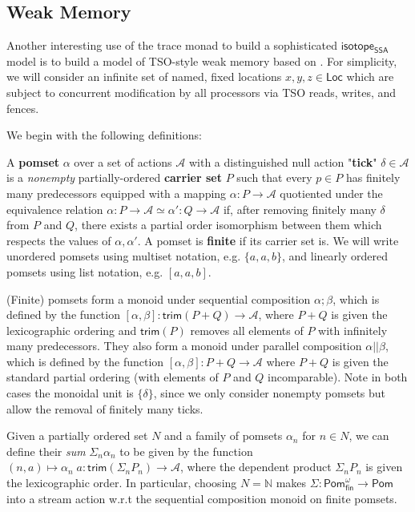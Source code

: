 \documentclass[acmsmall,screen,review]{acmart}
\newcommand{\mc}[1]{\ensuremath{\mathcal{#1}}}
\newcommand{\ms}[1]{\ensuremath{\mathsf{#1}}}
\newcommand{\nats}{\mathbb{N}}
\newcommand{\isotopessa}{\ms{isotope_{SSA}}}
\begin{document}
\subsection{Weak Memory}

Another interesting use of the trace monad to build a sophisticated \isotopessa model is to build a model of TSO-style weak memory based on \citet{sparky}. For simplicity, we will consider an infinite set of named, fixed locations \(x, y, z \in \ms{Loc}\) which are subject to concurrent modification by all processors via TSO reads, writes, and fences.

We begin with the following definitions:
\begin{definition}[Pomset] 
  A \textbf{pomset} \(\alpha\) over a set of actions \(\mc{A}\) with a
  distinguished null action "\textbf{tick}" \(\delta \in \mc{A}\) is a
  \textit{nonempty} partially-ordered \textbf{carrier set} \(P\) such that every
  \(p \in P\) has finitely many predecessors equipped with a mapping \(\alpha: P
  \to \mc{A}\) quotiented under the equivalence relation \(\alpha: P \to \mc{A}
  \simeq \alpha': Q \to \mc{A}\) if, after removing finitely many \(\delta\)
  from \(P\) and \(Q\), there exists a partial order isomorphism between them
  which respects the values of \(\alpha, \alpha'\). A pomset is \textbf{finite}
  if its carrier set is. We will write unordered pomsets using multiset
  notation, e.g. \(\{a, a, b\}\), and linearly ordered pomsets using list
  notation, e.g. \([a, a, b]\).
\end{definition}
(Finite) pomsets form a monoid under sequential composition \(\alpha;\beta\),
which is defined by the function \([\alpha, \beta]: \ms{trim}(P + Q) \to
\mc{A}\), where \(P + Q\) is given the lexicographic ordering and
\(\ms{trim}(P)\) removes all elements of \(P\) with infinitely many
predecessors. They also form a monoid under parallel composition \(\alpha ||
\beta\), which is defined by the function \([\alpha, \beta]: P + Q \to \mc{A}\)
where \(P + Q\) is given the standard partial ordering (with elements of \(P\)
and \(Q\) incomparable). Note in both cases the monoidal unit is \(\{\delta\}\),
since we only consider nonempty pomsets but allow the removal of finitely many
ticks.

Given a partially ordered set \(N\) and a family of pomsets \(\alpha_n\) for \(n
\in N\), we can define their \textit{sum} \(\Sigma_n\alpha_n\) to be given by
the function \((n, a) \mapsto \alpha_n\;a: \ms{trim}(\Sigma_nP_n) \to \mc{A}\),
where the dependent product \(\Sigma_nP_n\) is given the lexicographic order. In
particular, choosing \(N = \nats\) makes \(\Sigma: \ms{Pom}_{\ms{fin}}^\omega
\to \ms{Pom}\) into a stream action w.r.t the sequential composition monoid on
finite pomsets. 
\end{document}
